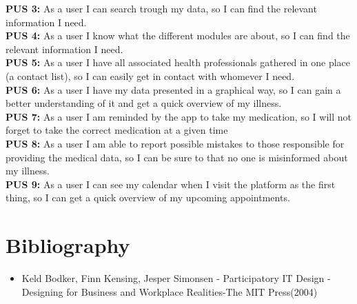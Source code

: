 \documentclass[a4paper,11pt]{article}
\begin{document}
\textbf{PUS 3:} As a user I can search trough my data, so I can find the relevant information I need.\\

\textbf{PUS 4:} As a user I know what the different modules are about, so I can find the relevant information I need.\\

\textbf{PUS 5:} As a user I have all associated health professionals gathered in one place (a contact list), so I can easily get in contact with whomever I need.\\

\textbf{PUS 6:} As a user I have my data presented in a graphical way, so I can gain a better understanding of it and get a quick overview of my illness.\\

\textbf{PUS 7:} As a user I am reminded by the app to take my medication, so I will not forget to take the correct medication at a given time\\

\textbf{PUS 8:} As a user I am able to report possible mistakes to those responsible for providing the medical data, so I can be sure to that no one is misinformed about my illness.\\

\textbf{PUS 9:} As a user I can see my calendar when I visit the platform as the first thing, so I can get a quick overview of my upcoming appointments.\\

\newpage
\section{Bibliography}
\begin{itemize}
    \item Keld Bodker, Finn Kensing, Jesper Simonsen - Participatory IT Design - Designing for Business and Workplace Realities-The MIT Press(2004)
\end{itemize}
\end{document}
